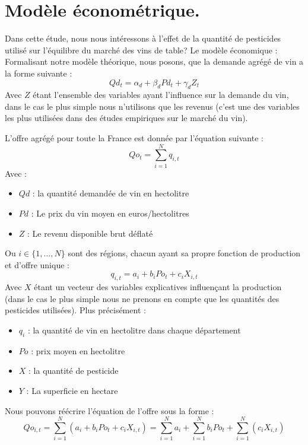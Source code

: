 \documentclass[11pt, a4paper]{article}
\begin{document}
\section*{Modèle économétrique.}
Dans cette étude, nous nous intéressons à l’effet de la quantité de pesticides utilisé sur l’équilibre du marché des vins de table?
Le modèle économique :
Formalisant notre modèle théorique, nous posons, que la demande agrégé de vin a la forme suivante :
\begin{equation}
    Qd_t = \alpha_d + \beta_d Pd_t + \gamma_d Z_t
\end{equation}
Avec $Z$ étant l'ensemble des variables ayant l'influence sur la demande du vin, dans le cas le plus simple nous n'utilisons que les revenus (c'est une des variables les plus utilisées dans des études empiriques sur le marché du vin).
\par
L'offre agrégé pour toute la France est donnée par l'équation suivante : 
\begin{equation}
    Qo_t = \sum_{i = 1}^{N} q_{i,t}
\end{equation}
Avec :
\begin{itemize}
  \item $Qd$ : la quantité demandée de vin en hectolitre
  \item $Pd$ : Le prix du vin moyen en euros/hectolitres
  \item $Z$ : Le revenu disponible brut déflaté
\end{itemize}
Ou $i \in \{1, ..., N\}$ sont des régions, chacun ayant sa propre fonction de production et d'offre unique : 
\begin{equation}
    q_{i,t} = a_i + b_i Po_t + c_i X_{i,t}
\end{equation}
Avec $X$ étant un vecteur des variables explicatives influençant la production (dans le cas le plus simple nous ne prenons en compte que les quantités des pesticides utilisées).
Plus précisément :
\begin{itemize}
  \item $q_i$ : la quantité de vin en hectolitre dans chaque département
  \item $Po$ : prix moyen en hectolitre
  \item $X$ : la quantité de pesticide
  \item $Y$ : La superficie en hectare
\end{itemize}
Nous pouvons réécrire l'équation de l'offre sous la forme :
\begin{equation}
    Qo_{i,t} = \sum_{i = 1}^{N} (a_i + b_i Po_{t} + c_i X_{i,t}) = \sum_{i = 1}^{N} a_i + \sum_{i = 1}^{N} b_i Po_{t} + \sum_{i = 1}^{N} (c_i X_{i,t})
\end{equation}
\end{document}
